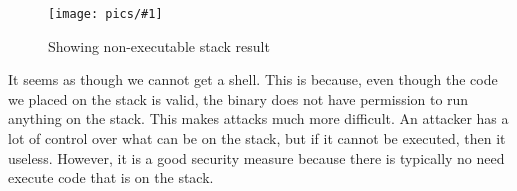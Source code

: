\documentclass[11pt]{article}
\newcommand{\fig}[2]{ 
\begin{figure}[h]
	\centering
	\caption{#2}
	\texttt{[image: pics/\#1]}
	\label{fig:#1}
\end{figure} 
}
\begin{document}
\fig{task6}{Showing non-executable stack result}

It seems as though we cannot get a shell. This is because, even though the code we placed on the stack is valid, the binary does not have permission to run anything on the stack. This makes attacks much more difficult. An attacker has a lot of control over what can be on the stack, but if it cannot be executed, then it useless. However, it is a good security measure because there is typically no need execute code that is on the stack.
\end{document}
